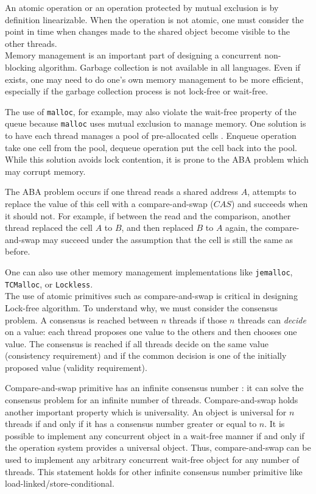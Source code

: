 An atomic operation or an operation protected by mutual exclusion is by
definition linearizable. When the operation is not atomic, one must consider the
point in time when changes made to the shared object become visible to the other
threads. \\

 Memory management is an important part of designing a
concurrent non-blocking algorithm. Garbage collection is not available in all
languages. Even if exists, one may need to do one's own memory management to
be more efficient, especially if the garbage collection process is not lock-free
or wait-free.

The use of \texttt{malloc}, for example, may also violate the wait-free property
of the queue because \texttt{malloc} uses mutual exclusion to manage memory. One
solution is to have each thread manages a pool of pre-allocated cells
\cite{Herlihy08}. Enqueue operation take one cell from the pool, dequeue
operation put the cell back into the pool. While this solution avoids lock
contention, it is prone to the ABA problem which may corrupt memory.

The ABA problem occurs if one thread reads a shared address $A$, attempts to
replace the value of this cell with a compare-and-swap ($CAS$) and succeeds when
it should not. For example, if between the read and the comparison, another
thread replaced the cell $A$ to $B$, and then replaced $B$ to $A$ again, the
compare-and-swap may succeed under the assumption that the cell is still the
same as before.

One can also use other memory management implementations like \texttt{jemalloc},
\texttt{TCMalloc}, or \texttt{Lockless}. \\

 The use of atomic primitives such as compare-and-swap is
critical in designing Lock-free algorithm. To understand why, we must consider
the consensus problem. A consensus is reached between $n$ threads if those $n$
threads can \textit{decide} on a value: each thread proposes one value to the
others and then chooses one value. The consensus is reached if all threads
decide on the same value (consistency requirement) and if the common decision is
one of the initially proposed value (validity requirement).

Compare-and-swap primitive has an infinite consensus number
\cite{Herlihy:1991:WS:114005.102808}: it can solve the consensus problem for an
infinite number of threads. Compare-and-swap holds another important property
which is universality. An object is universal for $n$ threads if and only if it
has a consensus number greater or equal to $n$. It is possible to implement any
concurrent object in a wait-free manner if and only if the operation system
provides a universal object. Thus, compare-and-swap can be used to implement
any arbitrary concurrent wait-free object for any number of threads. This
statement holds for other infinite consensus number primitive like
load-linked/store-conditional. \\

